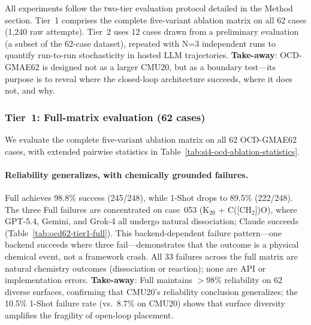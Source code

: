All experiments follow the two-tier evaluation protocol detailed in the Method section.
Tier~1 comprises the complete five-variant ablation matrix on all 62 cases (1{,}240 raw attempts).
Tier~2 uses 12 cases drawn from a preliminary evaluation (a subset of the 62-case dataset), repeated with N=3 independent runs to quantify run-to-run stochasticity in hosted LLM trajectories.
\textbf{Take-away}: OCD-GMAE62 is designed not as a larger CMU20, but as a boundary test---its purpose is to reveal where the closed-loop architecture succeeds, where it does not, and why.

\subsubsection{Tier~1: Full-matrix evaluation (62 cases)}

We evaluate the complete five-variant ablation matrix on all 62 OCD-GMAE62 cases, with extended pairwise statistics in Table~\ref{tab:si4-ocd-ablation-statistics}.

\paragraph{Reliability generalizes, with chemically grounded failures.}
Full achieves 98.8\% success (245/248), while 1-Shot drops to 89.5\% (222/248).
The three Full failures are concentrated on case~053 (K$_{20}$ + C([CH$_{2}$])O), where GPT-5.4, Gemini, and Grok-4 all undergo natural dissociation; Claude succeeds (Table~\ref{tab:ocd62-tier1-full}).
This backend-dependent failure pattern---one backend succeeds where three fail---demonstrates that the outcome is a physical chemical event, not a framework crash.
All 33 failures across the full matrix are natural chemistry outcomes (dissociation or reaction); none are API or implementation errors.
\textbf{Take-away}: Full maintains $>$98\% reliability on 62 diverse surfaces, confirming that CMU20's reliability conclusion generalizes; the 10.5\% 1-Shot failure rate (vs.\ 8.7\% on CMU20) shows that surface diversity amplifies the fragility of open-loop placement.

